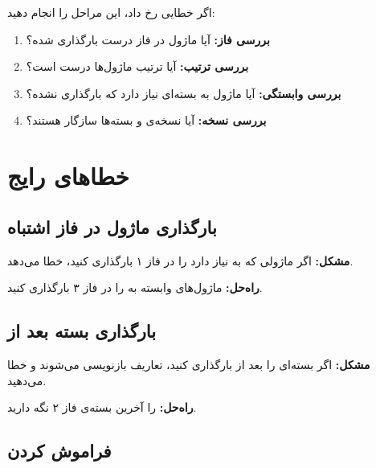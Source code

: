 اگر خطایی رخ داد، این مراحل را انجام
دهید:

\begin{enumerate}
    \item \textbf{بررسی فاز:} آیا ماژول در
    فاز درست بارگذاری شده؟

    \item \textbf{بررسی ترتیب:} آیا ترتیب
    ماژول‌ها درست است؟

    \item \textbf{بررسی وابستگی:} آیا ماژول
    به بسته‌ای نیاز دارد که بارگذاری
    نشده؟

    \item \textbf{بررسی نسخه:} آیا نسخه‌ی
     و بسته‌ها سازگار هستند؟
\end{enumerate}


\section{خطاهای رایج}
\label{sec:modules-mistakes}

\subsection{بارگذاری ماژول در فاز اشتباه}
\label{sec:modules-mistake-phase}

\textbf{مشکل:} اگر ماژولی که به
 نیاز دارد را در فاز ۱
بارگذاری کنید، خطا می‌دهد.

\textbf{راه‌حل:} ماژول‌های وابسته به
 را در فاز ۳ بارگذاری کنید.

\subsection{بارگذاری بسته بعد از }
\label{sec:modules-mistake-after}

\textbf{مشکل:} اگر بسته‌ای را بعد از
 بارگذاری کنید، تعاریف
 بازنویسی می‌شوند و خطا می‌دهید.

\textbf{راه‌حل:}  را آخرین
بسته‌ی فاز ۲ نگه دارید.

\subsection{فراموش کردن }
\label{sec:modules-mistake-require}

